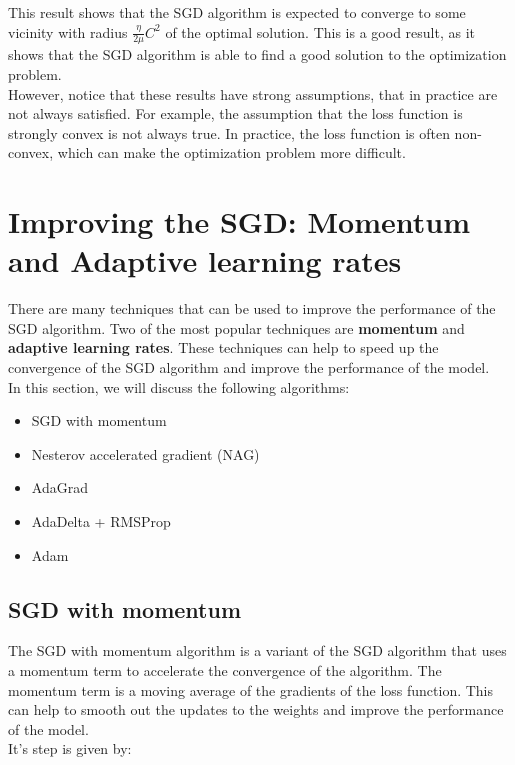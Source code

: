 This result shows that the SGD algorithm is expected to converge to some vicinity with radius
$\frac{\eta}{2\mu} C^2$ of the optimal solution. This is a good result, as it shows that the
SGD algorithm is able to find a good solution to the optimization problem.\\

However, notice that these results have strong assumptions, that in practice are not always
satisfied. For example, the assumption that the loss function is strongly convex is not always
true. In practice, the loss function is often non-convex, which can make the optimization problem
more difficult. 


\section{Improving the SGD: Momentum and Adaptive learning rates}

There are many techniques that can be used to improve the performance of the SGD algorithm.
Two of the most popular techniques are \textbf{momentum} and \textbf{adaptive learning rates}.
These techniques can help to speed up the convergence of the SGD algorithm and improve the
performance of the model.\\

In this section, we will discuss the following algorithms:

\begin{itemize}
    \item SGD with momentum
    \item Nesterov accelerated gradient (NAG)
    \item AdaGrad
    \item AdaDelta + RMSProp
    \item Adam
\end{itemize}

\subsection{SGD with momentum}

The SGD with momentum algorithm is a variant of the SGD algorithm that uses a momentum term to
accelerate the convergence of the algorithm. The momentum term is a moving average of the
gradients of the loss function. This can help to smooth out the updates to the weights and
improve the performance of the model.\\

It's step is given by:

